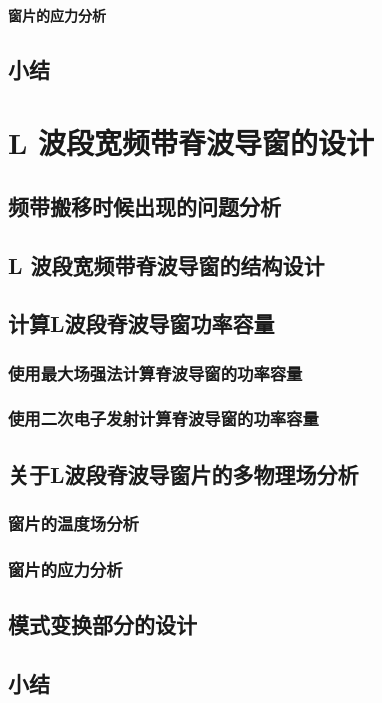 \documentclass[master]{thesis-uestc}
\begin{document}
\subsubsection{窗片的应力分析}
\section{小结}
\chapter{L 波段宽频带脊波导窗的设计}
\section{频带搬移时候出现的问题分析}

\section{L 波段宽频带脊波导窗的结构设计}

\section{计算L波段脊波导窗功率容量}
\subsection{使用最大场强法计算脊波导窗的功率容量}
\subsection{使用二次电子发射计算脊波导窗的功率容量}
\section{关于L波段脊波导窗片的多物理场分析}
\subsection{窗片的温度场分析}
\subsection{窗片的应力分析}
\section{模式变换部分的设计}
\section{小结}
\end{document}
